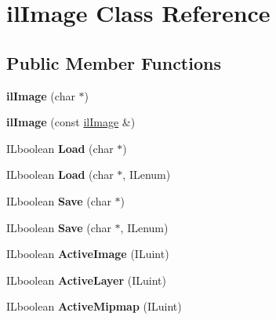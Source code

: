 \hypertarget{classilImage}{
\section{ilImage Class Reference}
\label{classilImage}
}
\subsection*{Public Member Functions}
\begin{DoxyCompactItemize}
\item 
\hypertarget{classilImage_a54b3bdcd19535b51f46ae196bd324aa2}{
{\bfseries ilImage} (char $\ast$)}
\label{classilImage_a54b3bdcd19535b51f46ae196bd324aa2}

\item 
\hypertarget{classilImage_a8835ff2785a1287caad2ffd121017cdc}{
{\bfseries ilImage} (const \hyperlink{classilImage}{ilImage} \&)}
\label{classilImage_a8835ff2785a1287caad2ffd121017cdc}

\item 
\hypertarget{classilImage_a0c56a726c4dc8d17a4bec5115834f305}{
ILboolean {\bfseries Load} (char $\ast$)}
\label{classilImage_a0c56a726c4dc8d17a4bec5115834f305}

\item 
\hypertarget{classilImage_a6eef4d2d15228b248b56ac03d70c97cb}{
ILboolean {\bfseries Load} (char $\ast$, ILenum)}
\label{classilImage_a6eef4d2d15228b248b56ac03d70c97cb}

\item 
\hypertarget{classilImage_af962d795b6f8c82be013ec511720ddf6}{
ILboolean {\bfseries Save} (char $\ast$)}
\label{classilImage_af962d795b6f8c82be013ec511720ddf6}

\item 
\hypertarget{classilImage_a2f3e826c18ca6820a473e626134cd4f4}{
ILboolean {\bfseries Save} (char $\ast$, ILenum)}
\label{classilImage_a2f3e826c18ca6820a473e626134cd4f4}

\item 
\hypertarget{classilImage_a5635938ffee8a3856811e5c51658a0f8}{
ILboolean {\bfseries ActiveImage} (ILuint)}
\label{classilImage_a5635938ffee8a3856811e5c51658a0f8}

\item 
\hypertarget{classilImage_a52781721e97af4840259699518ff63d8}{
ILboolean {\bfseries ActiveLayer} (ILuint)}
\label{classilImage_a52781721e97af4840259699518ff63d8}

\item 
\hypertarget{classilImage_a5ee7041f179112a50218964e3d8aab81}{
ILboolean {\bfseries ActiveMipmap} (ILuint)}
\label{classilImage_a5ee7041f179112a50218964e3d8aab81}


\end{DoxyCompactItemize}
